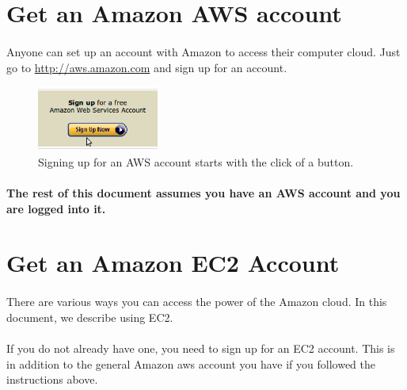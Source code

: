 \section{Get an Amazon AWS account}

\paragraph{}Anyone can set up an account with Amazon to access their computer cloud. Just go to \href{http://aws.amazon.com}{http://aws.amazon.com} and sign up for an account.

\begin{figure}
\includegraphics[width=40mm]{"images/aws_signup_button"}
\caption[Sign up for AWS]{\label{fig:aws_signup}Signing up for an AWS account starts with the click of a button.}
\end{figure}

\paragraph{The rest of this document assumes you have an AWS account and you are logged into it.}

\section{Get an Amazon EC2 Account}

\paragraph{}There are various ways you can access the power of the Amazon cloud. In this document, we describe using EC2. 

\paragraph{}If you do not already have one, you need to sign up for an EC2 account. This is in addition to the general Amazon aws account you have if you followed the instructions above. 

